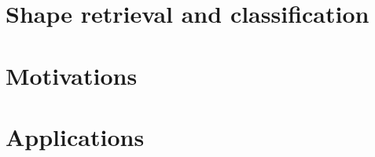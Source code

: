 \documentclass[../tech_report_1.tex]{subfiles}
\begin{document}

\section{Shape retrieval and classification}

\section{Motivations}

\section{Applications}
\end{document}
